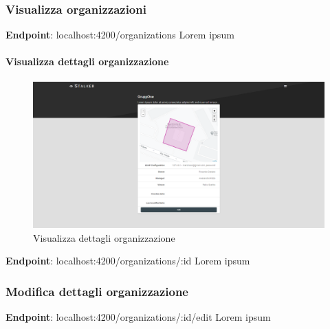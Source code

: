 \documentclass[../manuale-utente.tex]{subfiles}
\begin{document}
\subsubsection{Visualizza organizzazioni}%
\label{subs:visualizza-organizzazioni}


\textbf{Endpoint}: localhost:4200/organizations
Lorem ipsum

\paragraph{Visualizza dettagli organizzazione}%
\label{par:visualizza-dettagli-organizzazione}

\begin{figure}[H]
    \centering
    \includegraphics{img/web-app/visualizza-dettagli-organizzazione.png}
    \caption{Visualizza dettagli organizzazione}%
    \label{fig:web-app-visualizza-dettagli-organizzazione}
\end{figure}

\textbf{Endpoint}: localhost:4200/organizations/:id
Lorem ipsum



\subsubsection{Modifica dettagli organizzazione}%
\label{subs:modififica-dettagli-organizzazione}


\textbf{Endpoint}: localhost:4200/organizations/:id/edit
Lorem ipsum

\end{document}
